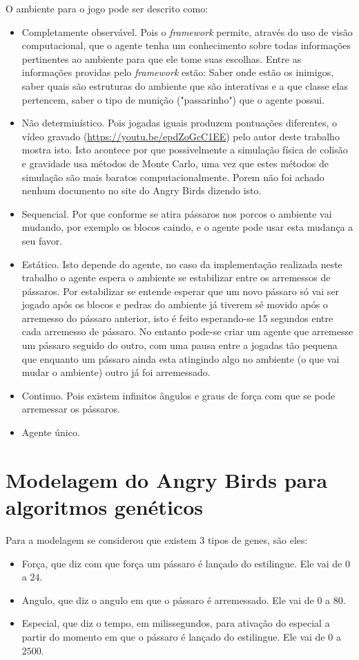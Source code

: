 \documentclass[10pt,a4paper]{article}
\begin{document}
O ambiente para o jogo pode ser descrito como: 
\begin{itemize}
\item Completamente observável. Pois o \emph{framework} permite, através do uso de visão computacional, que o agente tenha um conhecimento sobre todas informações pertinentes ao ambiente para que ele tome suas escolhas. Entre as informações providas pelo \emph{framework} estão: Saber onde estão os inimigos, saber quais são estruturas do ambiente que são interativas e a que classe elas pertencem, saber o tipo de munição ("passarinho") que o agente possui.
\item  Não determinístico. Pois jogadas iguais produzem pontuações diferentes, o vídeo gravado (\url{https://youtu.be/epdZoGcC1EE}) pelo  autor deste trabalho mostra isto. Isto acontece por que possivelmente a simulação física de colisão e gravidade usa métodos de Monte Carlo, uma vez que estes métodos de simulação são mais baratos computacionalmente. Porem não foi achado nenhum documento no site do Angry Birds dizendo isto.
\item Sequencial. Por que conforme se atira pássaros nos porcos o ambiente vai mudando, por exemplo os blocos caindo, e o agente pode usar esta mudança a seu favor.
\item Estático. Isto depende do agente, no caso da implementação realizada neste trabalho o agente espera o ambiente se estabilizar entre os arremessos de pássaros. Por estabilizar se entende esperar que um novo pássaro só vai ser jogado após os blocos e pedras do ambiente já tiverem sé movido após o arremesso do pássaro anterior, isto é feito esperando-se 15 segundos entre cada arremesso de pássaro.  No entanto pode-se criar um agente que arremesse um pássaro seguido do outro, com uma pausa entre a jogadas tão pequena que enquanto um pássaro  ainda esta atingindo algo no ambiente (o que vai mudar o ambiente) outro já foi arremessado. 
\item Continuo. Pois existem infinitos ângulos e graus de força com que se pode arremessar os pássaros.
\item Agente único. 
\end{itemize}


\section{Modelagem do Angry Birds para algoritmos genéticos}
\label{sec:modelagem}
Para a modelagem se considerou que existem 3 tipos de genes, são eles:
\begin{itemize}
  \item Força, que diz com que força um pássaro é lançado do estilingue. Ele vai de  $0$ a $24$.
  \item Angulo,  que diz o angulo em que o pássaro é arremessado. Ele vai de  $0$ a $80$.
  \item Especial, que diz o tempo, em milissegundos, para ativação do especial a partir do momento em que o pássaro é lançado do estilingue. Ele vai de  $0$ a $2500$.
\end{itemize}
\end{document}
